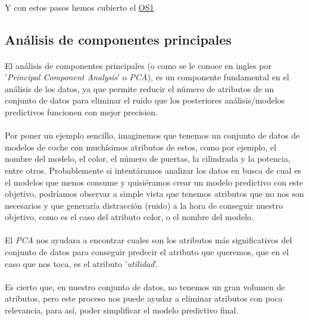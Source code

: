 \documentclass[10pt,a4paper,oneside]{book}
\begin{document}
\paragraph{}
Y con estos pasos hemos cubierto el \hyperref[os:OS1]{OS1}

\newpage
\subsection{Análisis de componentes principales}

\paragraph{}
El análisis de componentes principales (o como se le conoce en ingles por '\textit{Principal Component Analysis}' o \textit{PCA}), es un componente fundamental en el análisis de los datos, ya que permite reducir el número de atributos de un conjunto de datos para eliminar el ruido que los posteriores análisis/modelos predictivos funcionen con mejor precision.

\paragraph{}
Por poner un ejemplo sencillo, imaginemos que tenemos un conjunto de datos de modelos de coche con muchísimos atributos de estos, como por ejemplo, el nombre del modelo, el color, el número de puertas, la cilindrada y la potencia, entre otros. Probablemente si intentáramos analizar los datos en busca de cual es el modelos que menos consume y quisiéramos crear un modelo predictivo con este objetivo, podríamos observar a simple vista que tenemos atributos que no nos son necesarios y que generaría distracción (ruido) a la hora de conseguir nuestro objetivo, como es el caso del atributo color, o el nombre del modelo.

\paragraph{}
El \textit{PCA} nos ayudara a encontrar cuales son los atributos más significativos del conjunto de datos para conseguir predecir el atributo que queremos, que en el caso que nos toca, es el atributo '\textit{utilidad}'.

\paragraph{}
Es cierto que, en nuestro conjunto de datos, no tenemos un gran volumen de atributos, pero este proceso nos puede ayudar a eliminar atributos con poca relevancia, para así, poder simplificar el modelo predictivo final.
\end{document}
